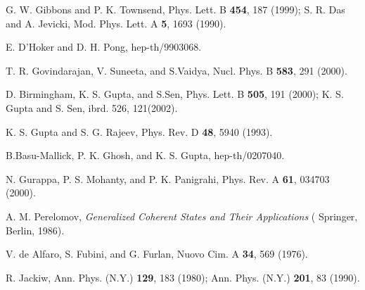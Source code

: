 \documentclass[a4paper,preprint,aps]{revtex4}
\def\Journal#1#2#3#4{{#1}{\bf #2},#3 (#4)}
\def\prd{{ Phys. Rev.} D}
\def\pra{{ Phys. Rev.} A}
\def\npb{{ Nucl. Phys.} B}
\def\plb{{ Phys. Lett.} B}
\def\nuov{{ Nuovo Cim.} A}
\def\ann{{ Ann. Phys. (N.Y.)}}
\def\mpla{{ Mod. Phys. Lett.} A}
\begin{document}
\begin{thebibliography}{99}
G. W. Gibbons and P. K. Townsend, \Journal{\plb}{ 454}{ 187}{1999};
S. R. Das and A. Jevicki, \Journal{\mpla}{ 5}{ 1693}{1990}.    

E. D'Hoker and D. H. Pong, hep-th/9903068.

T. R. Govindarajan, V. Suneeta, and S.Vaidya, \Journal{\npb}{ 583}{ 291}{2000}.

D. Birmingham, K. S. Gupta, and S.Sen, \Journal{\plb}{ 505}{ 191}{2000};
K. S. Gupta and S. Sen, ibrd. 526, 121(2002).

K. S. Gupta and S. G. Rajeev, \Journal{\prd}{ 48}{ 5940}{1993}.
 
B.Basu-Mallick, P. K. Ghosh, and K. S. Gupta, hep-th/0207040.

N. Gurappa, P. S. Mohanty, and P. K. Panigrahi,
\Journal{\pra}{ 61}{ 034703}{2000}.

A. M. Perelomov, {\em Generalized Coherent States and Their Applications} (
Springer, Berlin, 1986).

V. de Alfaro, S. Fubini, and G. Furlan, \Journal{\nuov}{ 34}{ 569}{1976}.

R. Jackiw, \Journal{\ann}{ 129}{ 183}{1980}; \Journal{\ann}{ 201}{ 83}{1990}.
\end{thebibliography}
\end{document}
